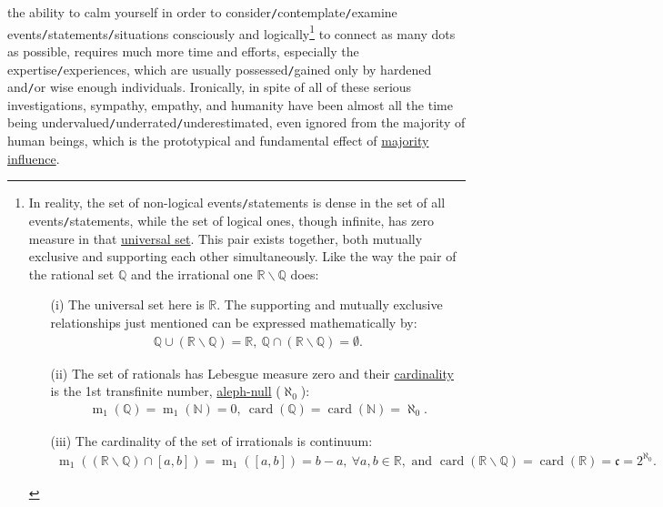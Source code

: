 \documentclass[12pt]{article}
\begin{document}
the ability to calm yourself in order to consider{\tt/}contemplate{\tt/}examine events{\tt/}statements{\tt/}situations consciously and logically\footnote{In reality, the set of non-logical events{\tt/}statements is dense in the set of all events{\tt/}statements, while the set of logical ones, though infinite, has zero measure in that \href{https://en.wikipedia.org/wiki/Universal_set}{universal set}. This pair exists together, both mutually exclusive and supporting each other simultaneously. Like the way the pair of the rational set $\mathbb{Q}$ and the irrational one $\mathbb{R}\backslash\mathbb{Q}$ does:
	\begin{itemize}
		\item[(i)] The universal set here is $\mathbb{R}$. The supporting and mutually exclusive relationships just mentioned can be expressed mathematically by:
		\begin{align*}
			\mathbb{Q}\cup(\mathbb{R}\backslash\mathbb{Q}) = \mathbb{R},\ \mathbb{Q}\cap(\mathbb{R}\backslash\mathbb{Q}) = \emptyset.
		\end{align*}
		\item[(ii)] The set of rationals has Lebesgue measure zero and their \href{https://en.wikipedia.org/wiki/Cardinality}{cardinality} is the 1st transfinite number, \href{https://en.wikipedia.org/wiki/Aleph_number}{aleph-null} ($\aleph_0$):
		\begin{align*}
			\operatorname{m}_1(\mathbb{Q}) = \operatorname{m}_1(\mathbb{N}) = 0,\ \operatorname{card}(\mathbb{Q}) = \operatorname{card}(\mathbb{N}) = \aleph_0.
		\end{align*}
		\item[(iii)] The cardinality of the set of irrationals is continuum:
		\begin{align*}
			\operatorname{m}_1((\mathbb{R}\backslash\mathbb{Q})\cap[a,b]) = \operatorname{m}_1([a,b]) = b - a,\ \forall a,b\in\mathbb{R}, \mbox{ and } \operatorname{card}(\mathbb{R}\backslash\mathbb{Q}) = \operatorname{card}(\mathbb{R}) = \mathfrak{c} = 2^{\aleph_0}.
		\end{align*}
\end{itemize}} to connect as many dots as possible, requires much more time and efforts, especially the expertise{\tt/}experiences, which are usually possessed{\tt/}gained only by hardened and{\tt/}or wise enough individuals. Ironically, in spite of all of these serious investigations, sympathy, empathy, and humanity have been almost all the time being undervalued{\tt/}underrated{\tt/}underestimated, even ignored from the majority of human beings, which is the prototypical and fundamental effect of \href{https://dictionary.apa.org/majority-influence}{majority influence}.
\end{document}
